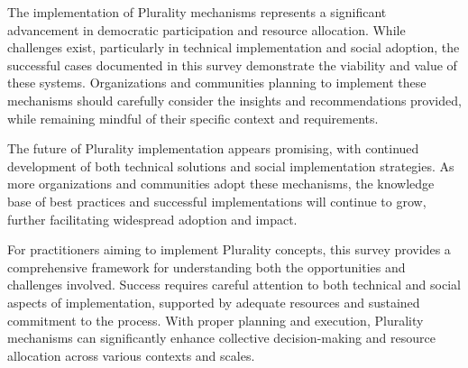 The implementation of Plurality mechanisms represents a significant advancement in democratic participation and resource allocation. While challenges exist, particularly in technical implementation and social adoption, the successful cases documented in this survey demonstrate the viability and value of these systems. Organizations and communities planning to implement these mechanisms should carefully consider the insights and recommendations provided, while remaining mindful of their specific context and requirements.

The future of Plurality implementation appears promising, with continued development of both technical solutions and social implementation strategies. As more organizations and communities adopt these mechanisms, the knowledge base of best practices and successful implementations will continue to grow, further facilitating widespread adoption and impact.

For practitioners aiming to implement Plurality concepts, this survey provides a comprehensive framework for understanding both the opportunities and challenges involved. Success requires careful attention to both technical and social aspects of implementation, supported by adequate resources and sustained commitment to the process. With proper planning and execution, Plurality mechanisms can significantly enhance collective decision-making and resource allocation across various contexts and scales.
